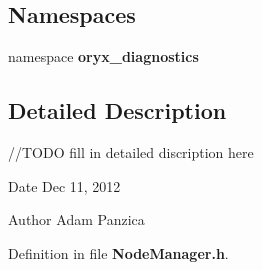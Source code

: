 \subsection*{\-Namespaces}
\begin{DoxyCompactItemize}
\item 
namespace {\bf oryx\-\_\-diagnostics}
\end{DoxyCompactItemize}


\subsection{\-Detailed \-Description}
//\-T\-O\-D\-O fill in detailed discription here \begin{DoxyDate}{\-Date}
\-Dec 11, 2012 
\end{DoxyDate}
\begin{DoxyAuthor}{\-Author}
\-Adam \-Panzica 
\end{DoxyAuthor}


\-Definition in file {\bf \-Node\-Manager.\-h}.


